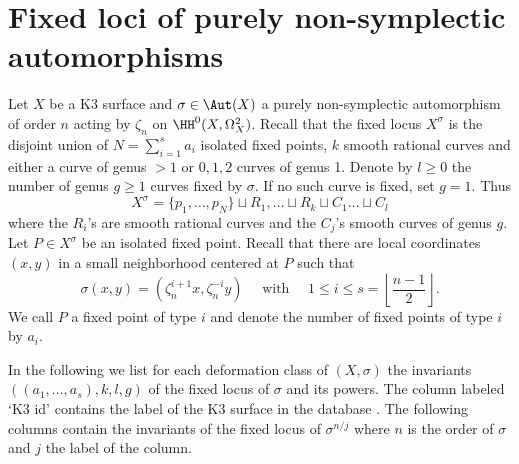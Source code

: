 \section{Fixed loci of purely non-symplectic automorphisms}
\label{appendixB}
 Let $X$ be a K3 surface and $\sigma \in \Aut(X)$ a purely non-symplectic automorphism of order $n$ acting by $\zeta_n$ on $\HH^0(X,\Omega_X^2)$.
 Recall that the fixed locus $X^\sigma$ is the disjoint union of $N = \sum_{i=1}^s a_i$ isolated fixed points, $k$ smooth rational curves and either a curve of genus $>1$
or $0, 1, 2$ curves of genus 1.
Denote by $l\geq 0$ the number of genus $g \geq 1$ curves fixed by $\sigma$. If no such curve is fixed, set $g=1$. Thus
\[X^\sigma = \{p_1, \dots, p_N\} \sqcup R_1 , \dots \sqcup R_k \sqcup C_1 \dots \sqcup C_l\]
where the $R_i$'s are smooth rational curves and the $C_j$'s smooth curves of genus $g$.
Let $P \in X^\sigma$ be an isolated fixed point. Recall that there are local coordinates $(x,y)$ in a small neighborhood centered at $P$ such that
\[\sigma(x,y) = (\zeta_n^{i+1}x,\zeta_n^{-i} y)\quad \mbox{  with } \quad 1 \leq i \leq s = \left\lfloor\frac{n-1}{2}\right\rfloor.\]
We call $P$ a fixed point of type $i$ and denote the number of fixed points of type $i$ by $a_i$.

In the following we list for each deformation class of $(X, \sigma)$ the invariants $((a_1, \dots, a_s), k, l, g)$ of the fixed locus of $\sigma$ and its powers.
The column labeled `K3 id' contains the label of the K3 surface in the database \cite{K3Groups}.
The following columns contain the invariants of the fixed locus of $\sigma^{n/j}$ where $n$ is the order of $\sigma$ and $j$ the label of the column.













